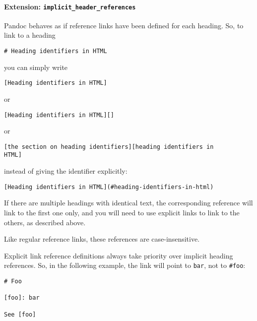 \documentclass[
  a4paper,
]{article}
\begin{document}
\hypertarget{extension-implicit_header_references}{%
\paragraph{\texorpdfstring{Extension:
\texttt{implicit\_header\_references}}{Extension: implicit\_header\_references}}\label{extension-implicit_header_references}}

Pandoc behaves as if reference links have been defined for each heading.
So, to link to a heading

\begin{verbatim}
# Heading identifiers in HTML
\end{verbatim}

you can simply write

\begin{verbatim}
[Heading identifiers in HTML]
\end{verbatim}

or

\begin{verbatim}
[Heading identifiers in HTML][]
\end{verbatim}

or

\begin{verbatim}
[the section on heading identifiers][heading identifiers in
HTML]
\end{verbatim}

instead of giving the identifier explicitly:

\begin{verbatim}
[Heading identifiers in HTML](#heading-identifiers-in-html)
\end{verbatim}

If there are multiple headings with identical text, the corresponding
reference will link to the first one only, and you will need to use
explicit links to link to the others, as described above.

Like regular reference links, these references are case-insensitive.

Explicit link reference definitions always take priority over implicit
heading references. So, in the following example, the link will point to
\texttt{bar}, not to \texttt{\#foo}:

\begin{verbatim}
# Foo

[foo]: bar

See [foo]
\end{verbatim}
\end{document}
